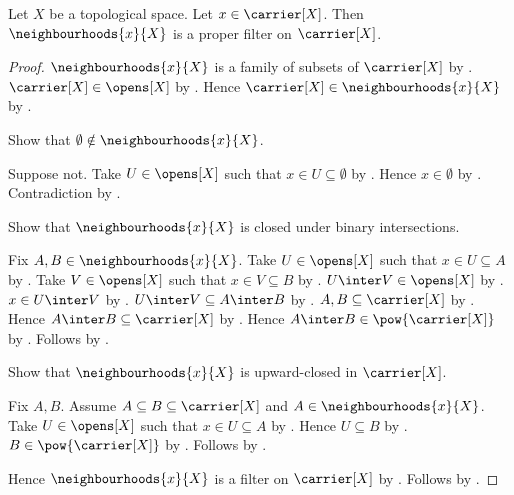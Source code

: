 \begin{classification}\label{neighbourhoods_is_proper_filter}
    Let $X$ be a topological space.
    Let $x\in\carrier[X]$.
    Then $\neighbourhoods{x}{X}$ is a proper filter on $\carrier[X]$.
\end{classification}
\begin{proof}
    $\neighbourhoods{x}{X}$ is a family of subsets of $\carrier[X]$
        by .
    $\carrier[X]\in\opens[X]$ by .
    Hence $\carrier[X]\in\neighbourhoods{x}{X}$
        by .

    Show that $\emptyset\notin\neighbourhoods{x}{X}$.
    \begin{subproof}
        Suppose not.
        Take $U\in\opens[X]$ such that $x\in U\subseteq\emptyset$
            by .
        Hence $x\in\emptyset$ by .
        Contradiction by .
    \end{subproof}

    Show that $\neighbourhoods{x}{X}$ is closed under binary intersections.
    \begin{subproof}
        Fix $A,B\in\neighbourhoods{x}{X}$.
        Take $U\in\opens[X]$ such that $x\in U\subseteq A$
            by .
        Take $V\in\opens[X]$ such that $x\in V\subseteq B$
            by .
        $U\inter V\in\opens[X]$ by .
        $x\in U\inter V$ by .
        $U\inter V\subseteq A\inter B$
            by .
        $A,B\subseteq\carrier[X]$
            by .
        Hence $A\inter B\subseteq\carrier[X]$
            by .
        Hence $A\inter B\in\pow{\carrier[X]}$
            by .
        Follows by .
    \end{subproof}

    Show that $\neighbourhoods{x}{X}$ is upward-closed in $\carrier[X]$.
    \begin{subproof}
        Fix $A,B$.
        Assume $A\subseteq B\subseteq\carrier[X]$ and
            $A\in\neighbourhoods{x}{X}$.
        Take $U\in\opens[X]$ such that $x\in U\subseteq A$
            by .
        Hence $U\subseteq B$ by .
        $B\in\pow{\carrier[X]}$ by .
        Follows by .
    \end{subproof}
    Hence $\neighbourhoods{x}{X}$ is a filter on $\carrier[X]$
        by .
    Follows by .
\end{proof}

